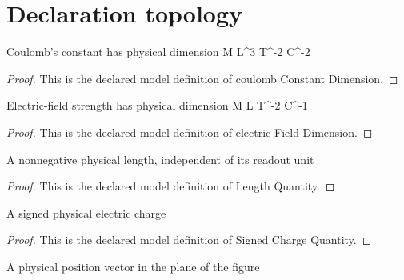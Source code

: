 \section{Declaration topology}
\begin{definition}
  \label{def:physics:phyx-mini-0915:phyxminiproblems-problemphyxmini0915-coulombconstantdimension}
  Coulomb's constant has physical dimension M L\textasciicircum{}3 T\textasciicircum{}-2 C\textasciicircum{}-2
\end{definition}
\begin{proof}
  This is the declared model definition of coulomb Constant Dimension.
\end{proof}
\begin{definition}
  \label{def:physics:phyx-mini-0915:phyxminiproblems-problemphyxmini0915-electricfielddimension}
  Electric-field strength has physical dimension M L T\textasciicircum{}-2 C\textasciicircum{}-1
\end{definition}
\begin{proof}
  This is the declared model definition of electric Field Dimension.
\end{proof}
\begin{definition}
  \label{def:physics:phyx-mini-0915:phyxminiproblems-problemphyxmini0915-lengthquantity}
  A nonnegative physical length, independent of its readout unit
\end{definition}
\begin{proof}
  This is the declared model definition of Length Quantity.
\end{proof}
\begin{definition}
  \label{def:physics:phyx-mini-0915:phyxminiproblems-problemphyxmini0915-signedchargequantity}
  A signed physical electric charge
\end{definition}
\begin{proof}
  This is the declared model definition of Signed Charge Quantity.
\end{proof}
\begin{definition}
  \label{def:physics:phyx-mini-0915:phyxminiproblems-problemphyxmini0915-planarpositionquantity}
  A physical position vector in the plane of the figure
\end{definition}
